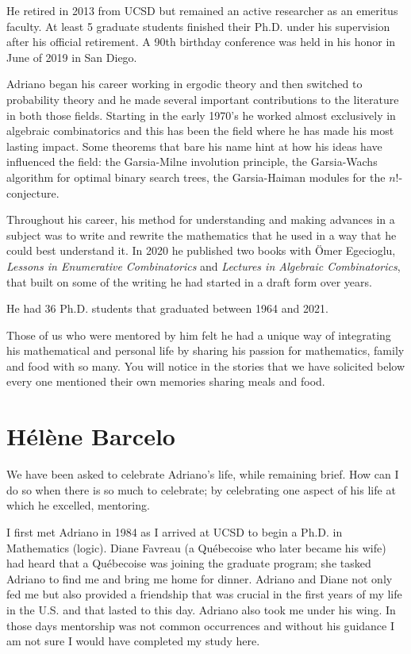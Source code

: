 \documentclass{notices}
\begin{document}
He retired in 2013 from UCSD but remained an active researcher as an emeritus faculty.  At least 5 graduate students finished their Ph.D. under his supervision after his official retirement.  A 90th birthday conference was held in his honor in June of 2019 in San Diego.

Adriano began his career working in ergodic theory and then switched to probability theory and he made several important contributions to the literature in both those fields.  Starting in the early 1970's he worked almost exclusively in algebraic
combinatorics and this has been the field where he has made his most lasting impact.  Some theorems that bare his name hint at how his ideas have influenced the field: the Garsia-Milne involution principle, the Garsia-Wachs algorithm for optimal binary search trees, the Garsia-Haiman modules for the $n!$-conjecture.

Throughout his career, his method for understanding and making advances in a subject was to write and rewrite the mathematics that he used in a way that he could best understand it.  In 2020 he published two books with Ömer Egecioglu, {\it Lessons in Enumerative Combinatorics} and {\it Lectures in Algebraic Combinatorics}, that built on some of the writing he had started in a draft form over years.

He had 36 Ph.D. students that graduated between 1964 and 2021.

Those of us who were mentored by him felt he had a unique way of integrating his mathematical and personal life by sharing his passion for mathematics, family and food with so many.  You will notice in the stories that we have solicited below every one mentioned their own memories sharing meals and food.

\section*{H\'el\`ene Barcelo}

We have been asked to celebrate Adriano's life, while remaining brief. How can I do so when there is so much to celebrate; by celebrating one aspect of his life at which he excelled, mentoring.

I first met Adriano in 1984 as I arrived at UCSD to begin a Ph.D. in Mathematics (logic). Diane Favreau (a Qu\'ebecoise who later became his wife) had heard that a Qu\'ebecoise was joining the graduate program; she tasked Adriano to find me and bring me home for dinner. Adriano and Diane not only fed me but also provided a friendship that was crucial in the first years of my life in the U.S. and that lasted to this day. Adriano also took me under his wing. In those days mentorship was not common occurrences and without his guidance I am not sure I would have completed my study here.
\end{document}
